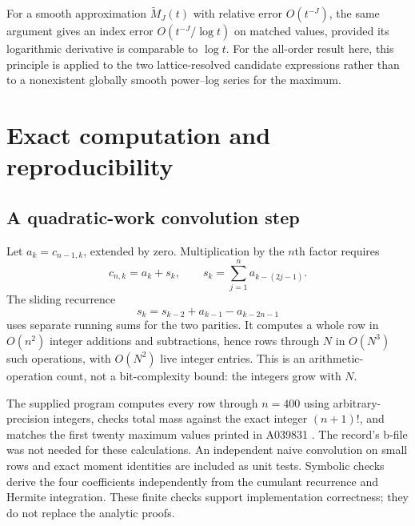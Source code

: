 \documentclass[11pt,a4paper]{article}
\numberwithin{equation}{section}
\theoremstyle{definition}\newtheorem{definition}[theorem]{Definition}
\theoremstyle{remark}\newtheorem{remark}[theorem]{Remark}
\begin{document}
For a smooth approximation $\widetilde M_J(t)$ with relative error
$O(t^{-J})$, the same argument gives an index error
$O(t^{-J}/\log t)$ on matched values, provided its logarithmic derivative
is comparable to $\log t$. For the all-order result here, this principle
is applied to the two lattice-resolved candidate expressions rather
than to a nonexistent globally smooth power--log series for the maximum.

\section{Exact computation and reproducibility}\label{tfp:sec:computation}
\subsection{A quadratic-work convolution step}
Let $a_k=c_{n-1,k}$, extended by zero. Multiplication by the $n$th factor
requires
\begin{equation}
 c_{n,k}=a_k+s_k,\qquad
 s_k=\sum_{j=1}^n a_{k-(2j-1)}.
\end{equation}
The sliding recurrence
\begin{equation}\label{tfp:eq:sliding}
 s_k=s_{k-2}+a_{k-1}-a_{k-2n-1}
\end{equation}
uses separate running sums for the two parities. It computes a whole
row in $O(n^2)$ integer additions and subtractions, hence rows through
$N$ in $O(N^3)$ such operations, with $O(N^2)$ live integer entries.
This is an arithmetic-operation count, not a bit-complexity bound:
the integers grow with $N$.

The supplied program computes every row through $n=400$ using arbitrary-
precision integers, checks total mass against the exact integer
$(n+1)!$, and matches the first twenty maximum values printed in
A039831 \cite{oeis831}. The record's b-file was not needed for these
calculations. An independent naive convolution on small rows and exact
moment identities are included as unit tests. Symbolic checks derive
the four coefficients independently from the cumulant recurrence and
Hermite integration. These finite checks support implementation
correctness; they do not replace the analytic proofs.
\end{document}

